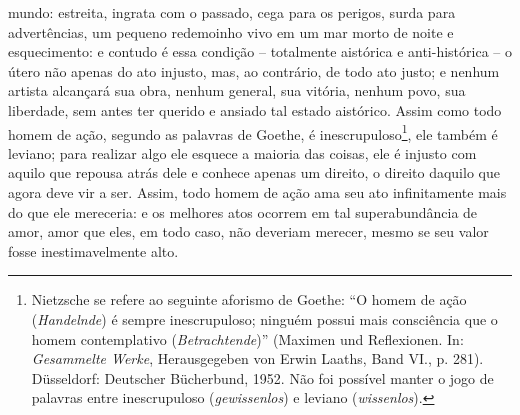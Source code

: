 mundo: estreita, ingrata com o passado, cega para os perigos, surda para
advertências, um pequeno redemoinho vivo em um mar morto de noite e
esquecimento: e contudo é essa condição -- totalmente aistórica e
anti-histórica -- o útero não apenas do ato injusto, mas, ao contrário,
de todo ato justo; e nenhum artista alcançará sua obra, nenhum general,
sua vitória, nenhum povo, sua liberdade, sem antes ter querido e ansiado
tal estado aistórico. Assim como todo homem de ação, segundo as palavras
de Goethe, é inescrupuloso\footnote{Nietz\-sche se refere ao seguinte
  aforismo de Goethe: ``O homem de ação (\emph{Handelnde}) é sempre
  inescrupuloso; ninguém possui mais consciência que o homem
  contemplativo (\emph{Betrachtende})'' (Maximen und Reflexionen.
  In: \emph{Gesammelte Werke}, Herausgegeben von Erwin Laaths, Band VI.,
  p. 281). Düsseldorf: Deutscher Bücherbund, 1952. Não foi possível
  manter o jogo de palavras entre inescrupuloso (\emph{gewissenlos}) e
  leviano (\emph{wissenlos}).}, ele também é leviano; para realizar algo
ele esquece a maioria das coisas, ele é injusto com aquilo que repousa
atrás dele e conhece apenas um direito, o direito daquilo que agora deve
vir a ser. Assim, todo homem de ação ama seu ato infinitamente mais do
que ele mereceria: e os melhores atos ocorrem em tal superabundância de
amor, amor que eles, em todo caso, não deveriam merecer, mesmo se seu
valor fosse inestimavelmente alto.

